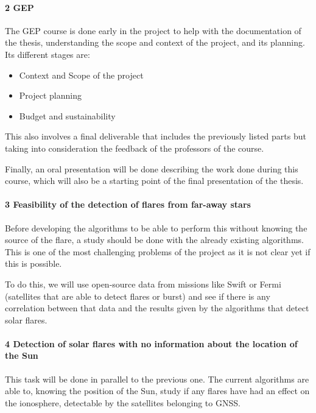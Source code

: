\paragraph{2 GEP}

The GEP course is done early in the project to help with the documentation of the thesis, understanding the scope and context of the project, and its planning. Its different stages are:

\begin{itemize}
	\item Context and Scope of the project
	\item Project planning
	\item Budget and sustainability
\end{itemize}

This also involves a final deliverable that includes the previously listed parts but taking into consideration the feedback of the professors of the course.

Finally, an oral presentation will be done describing the work done during this course, which will also be a starting point of the final presentation of the thesis.

\paragraph{3 Feasibility of the detection of flares from far-away stars}

Before developing the algorithms to be able to perform this without knowing the source of the flare, a study should be done with the already existing algorithms. This is one of the most challenging problems of the project as it is not clear yet if this is possible.

To do this, we will use open-source data from missions like Swift or Fermi (satellites that are able to detect flares or burst) and see if there is any correlation between that data and the results given by the algorithms that detect solar flares.

\paragraph{4 Detection of solar flares with no information about the location of the Sun}

This task will be done in parallel to the previous one. The current algorithms are able to, knowing the position of the Sun, study if any flares have had an effect on the ionosphere, detectable by the satellites belonging to GNSS. 

